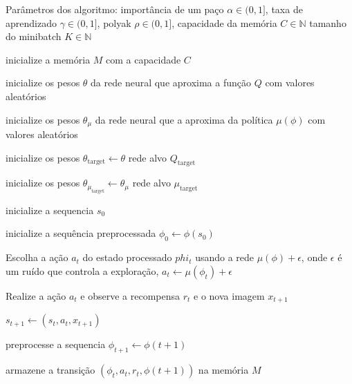 \begin{algorithm}[H]
    Parâmetros dos algoritmo:
    importância de um paço $\alpha \in (0,1]$,
    taxa de aprendizado $\gamma \in (0,1]$,
    polyak $\rho \in (0,1]$,
    capacidade da memória $C \in \mathbb{N}$
    tamanho do minibatch $K \in \mathbb{N}$ 

    inicialize a memória $M$ com a capacidade $C$

    inicialize os pesos $\theta$ da rede neural que aproxima a função $Q$ com valores aleatórios

    inicialize os pesos $\theta_\mu$ da rede neural que a aproxima da política $\mu(\phi)$ com valores aleatórios

    inicialize os pesos $\theta_{\text{target}}  \leftarrow \theta$ rede alvo $Q_{\text{target}}$

    inicialize os pesos $\theta_{\mu_{\text{target}}}  \leftarrow \theta_\mu$ rede alvo $\mu_{\text{target}}$


     {
        inicialize a sequencia $s_0$

        inicialize a sequência preprocessada $\phi_0 \leftarrow \phi(s_0)$ 
        

         {
            Escolha a ação $a_t$ do estado processado $phi_t$ usando a rede  $\mu(\phi) + \epsilon$, onde
            $\epsilon$ é um ruído que controla a exploração, $a_t \leftarrow \mu(\phi_t)  + \epsilon$ 

            Realize a ação $a_t$ e observe a recompensa $r_t$ e o nova imagem $x_{t+1}$
            
            $s_{t+1}  \leftarrow (s_t, a_t, x_{t+1})$   

            preprocesse a sequencia $\phi_{t+1} \leftarrow \phi(t+1)$
            
            armazene a transição $(\phi_t,a_t,r_t,\phi(t+1))$ na memória $M$

            }}
\end{algorithm}
